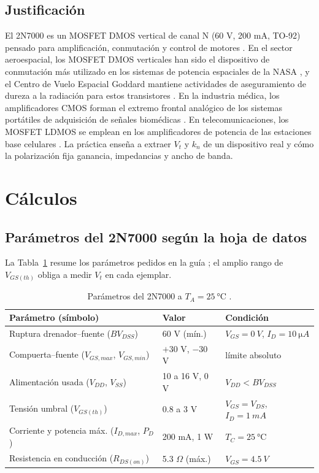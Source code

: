\documentclass[conference]{IEEEtran}
\newcommand{\kn}{k_n}
\begin{document}
\subsection{Justificación}
El 2N7000 es un MOSFET DMOS vertical de canal N (60 V, 200 mA, TO-92) pensado para amplificación, conmutación y control de motores \cite{datasheet}. En el sector aeroespacial, los MOSFET DMOS verticales han sido el dispositivo de conmutación más utilizado en los sistemas de potencia espaciales de la NASA \cite{shea}, y el Centro de Vuelo Espacial Goddard mantiene actividades de aseguramiento de dureza a la radiación para estos transistores \cite{lauenstein}. En la industria médica, los amplificadores CMOS forman el extremo frontal analógico de los sistemas portátiles de adquisición de señales biomédicas \cite{kao}. En telecomunicaciones, los MOSFET LDMOS se emplean en los amplificadores de potencia de las estaciones base celulares \cite{litwin}. La práctica enseña a extraer $V_t$ y $\kn$ de un dispositivo real y cómo la polarización fija ganancia, impedancias y ancho de banda.

\section{Cálculos}

\subsection{Parámetros del 2N7000 según la hoja de datos}
La Tabla~\ref{tab:datasheet} resume los parámetros pedidos en la guía \cite{datasheet}; el amplio rango de $V_{GS(th)}$ obliga a medir $V_t$ en cada ejemplar.

\begin{table}[htbp]
\centering
\caption{Parámetros del 2N7000 a $T_A=\SI{25}{\celsius}$ \cite{datasheet}.}
\label{tab:datasheet}
\scriptsize
\renewcommand{\arraystretch}{1.05}
\begin{tabular}{@{}lll@{}}
\toprule
Parámetro (símbolo) & Valor & Condición \\
\midrule
Ruptura drenador--fuente ($BV_{DSS}$) & 60 V (mín.) & $V_{GS}=\SI{0}{V}$, $I_D=\SI{10}{\micro A}$ \\
Compuerta--fuente ($V_{GS,max}$, $V_{GS,min}$) & $+30$ V, $-30$ V & límite absoluto \\
Alimentación usada ($V_{DD}$, $V_{SS}$) & 10 a 16 V, 0 V & $V_{DD}<BV_{DSS}$ \\
Tensión umbral ($V_{GS(th)}$) & 0.8 a 3 V & $V_{GS}=V_{DS}$, $I_D=\SI{1}{mA}$ \\
Corriente y potencia máx. ($I_{D,max}$, $P_D$) & 200 mA, 1 W & $T_C=\SI{25}{\celsius}$ \\
Resistencia en conducción ($R_{DS(on)}$) & 5.3 $\Omega$ (máx.) & $V_{GS}=\SI{4.5}{V}$ \\
\bottomrule
\end{tabular}
\end{table}
\end{document}
